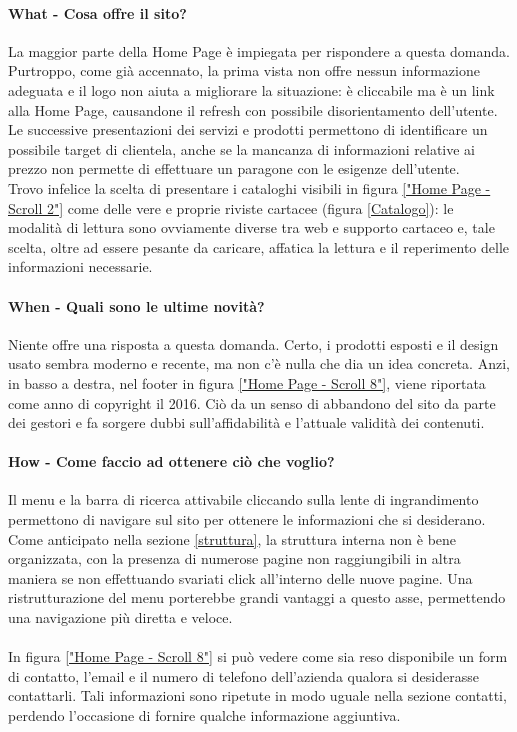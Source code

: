 \paragraph{What - Cosa offre il sito?}
La maggior parte della Home Page è impiegata per rispondere a questa domanda. Purtroppo, come già accennato, la prima vista non offre nessun informazione adeguata e il logo non aiuta a migliorare la situazione: è cliccabile ma è un link alla Home Page, causandone il refresh con possibile disorientamento dell'utente.
Le successive presentazioni dei servizi e prodotti permettono di identificare un possibile target di clientela, anche se la mancanza di informazioni relative ai prezzo non permette di effettuare un paragone con le esigenze dell'utente.\\
Trovo infelice la scelta di presentare i cataloghi visibili in figura \ref{"Home Page - Scroll 2"} come delle vere e proprie riviste cartacee (figura \ref{Catalogo}): le modalità di lettura sono ovviamente diverse tra web e supporto cartaceo e, tale scelta, oltre ad essere pesante da caricare, affatica la lettura e il reperimento delle informazioni necessarie.

\paragraph{When - Quali sono le ultime novità?}
Niente offre una risposta a questa domanda. Certo, i prodotti esposti e il design usato sembra moderno e recente, ma non c'è nulla che dia un idea concreta. Anzi, in basso a destra, nel footer in figura \ref{"Home Page - Scroll 8"}, viene riportata come anno di copyright il 2016. Ciò da un senso di abbandono del sito da parte dei gestori e fa sorgere dubbi sull'affidabilità e l'attuale validità dei contenuti.
 
\paragraph{How - Come faccio ad ottenere ciò che voglio?}
Il menu e la barra di ricerca attivabile cliccando sulla lente di ingrandimento permettono di navigare sul sito per ottenere le informazioni che si desiderano. Come anticipato nella sezione \ref{struttura}, la struttura interna non è bene organizzata, con la presenza di numerose pagine non raggiungibili in altra maniera se non effettuando svariati click all'interno delle nuove pagine. Una ristrutturazione del menu porterebbe grandi vantaggi a questo asse, permettendo una navigazione più diretta e veloce. \\ \\ In figura \ref{"Home Page - Scroll 8"} si può vedere come sia reso disponibile un form di contatto, l'email e il numero di telefono dell'azienda qualora si desiderasse contattarli. Tali informazioni sono ripetute in modo uguale nella sezione contatti, perdendo l'occasione di fornire qualche informazione aggiuntiva.

